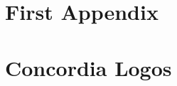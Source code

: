 \documentclass[letterpaper,12pt,onecolumn,final]{report}
\begin{document}
\begin{appendices}
\doublespacing

\chapter{First Appendix}
\label{chap:apdx1}



\chapter{Concordia Logos}
\label{chap:logos}

\end{appendices}
\end{document}
